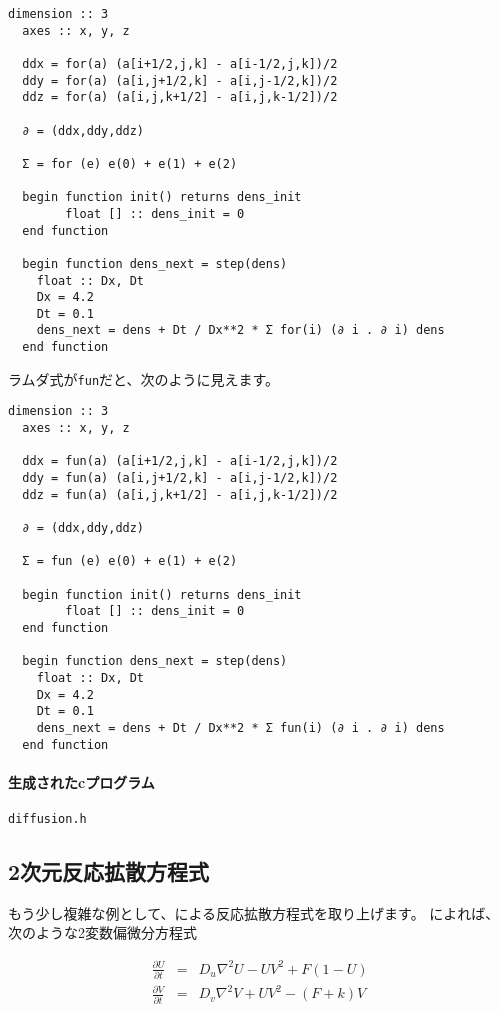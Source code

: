 \documentclass{jsarticle}
\begin{document}
\begin{lstlisting}[mathescape]
  dimension :: 3
  axes :: x, y, z

  ddx = for(a) (a[i+1/2,j,k] - a[i-1/2,j,k])/2
  ddy = for(a) (a[i,j+1/2,k] - a[i,j-1/2,k])/2
  ddz = for(a) (a[i,j,k+1/2] - a[i,j,k-1/2])/2

  ∂ = (ddx,ddy,ddz)

  Σ = for (e) e(0) + e(1) + e(2)

  begin function init() returns dens_init
        float [] :: dens_init = 0
  end function

  begin function dens_next = step(dens)
    float :: Dx, Dt
    Dx = 4.2
    Dt = 0.1
    dens_next = dens + Dt / Dx**2 * Σ for(i) (∂ i . ∂ i) dens
  end function
\end{lstlisting}

ラムダ式が\verb`fun`だと、次のように見えます。

\begin{lstlisting}[mathescape]
  dimension :: 3
  axes :: x, y, z

  ddx = fun(a) (a[i+1/2,j,k] - a[i-1/2,j,k])/2
  ddy = fun(a) (a[i,j+1/2,k] - a[i,j-1/2,k])/2
  ddz = fun(a) (a[i,j,k+1/2] - a[i,j,k-1/2])/2

  ∂ = (ddx,ddy,ddz)

  Σ = fun (e) e(0) + e(1) + e(2)

  begin function init() returns dens_init
        float [] :: dens_init = 0
  end function

  begin function dens_next = step(dens)
    float :: Dx, Dt
    Dx = 4.2
    Dt = 0.1
    dens_next = dens + Dt / Dx**2 * Σ fun(i) (∂ i . ∂ i) dens
  end function
\end{lstlisting}


\paragraph{生成されたcプログラム}

\verb`diffusion.h`



\subsection{2次元反応拡散方程式}

もう少し複雑な例として、\citet{pearson1993complex}による反応拡散方程式を取り上げます。
\citet{pearson1993complex}によれば、次のような2変数偏微分方程式

\begin{eqnarray}
  \frac{\partial U}{\partial t} &=& D_u \nabla^2 U - UV^2 + F(1-U)\\
  \frac{\partial V}{\partial t} &=& D_v \nabla^2 V + UV^2 - (F+k)V
\end{eqnarray}
\end{document}
